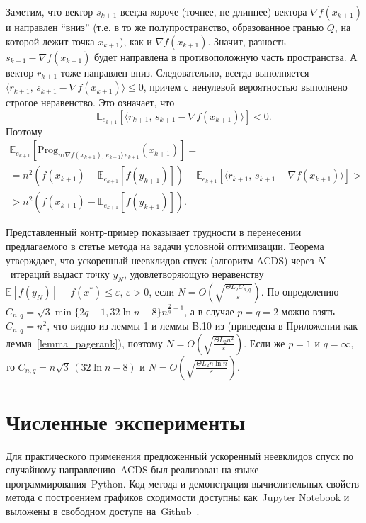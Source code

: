 \documentclass[11pt]{article}
\def\Prog{\text{Prog}}
\newcommand{\E}{\mathbb{E}}
\begin{document}
		Заметим, что вектор $s_{k+1}$ всегда короче (точнее, не длиннее) вектора $\nabla f(x_{k+1})$ и направлен ``вниз'' (т.е. в то же полупространство, образованное гранью $Q$, на которой лежит точка $x_{k+1}$), как и $\nabla f(x_{k+1})$. Значит, разность $s_{k+1} - \nabla f(x_{k+1})$ будет направлена в противоположную часть пространства. А вектор $r_{k+1}$ тоже направлен вниз. Следовательно, всегда выполняется $\langle r_{k+1}, \, s_{k+1} - \nabla f(x_{k+1})\rangle \leqslant 0$, причем с ненулевой вероятностью выполнено строгое неравенство. Это означает, что 
		$$
		\E_{e_{k+1}}\left[\langle r_{k+1}, \, s_{k+1} - \nabla f(x_{k+1})\rangle\right] < 0.
		$$
		Поэтому
		\begin{equation*}
			\begin{array}{l}
				\E_{e_{k+1}}\left[\Prog_{n\langle\nabla f(x_{k+1}), \, e_{k+1}\rangle \,  e_{k+1}}(x_{k+1})\right]=\\ = n^2(f(x_{k+1}) - \E_{e_{k+1}}[f(y_{k+1})]) - \E_{e_{k+1}}\left[\langle r_{k+1}, \, s_{k+1} - \nabla f(x_{k+1})\rangle\right]>\\ > n^2 \left ( f(x_{k+1}) - \E_{e_{k+1}} \left [f(y_{k+1}) \right ] \right ).
			\end{array}
		\end{equation*}
		
		
	Представленный контр-пример показывает трудности в перенесении предлагаемого в статье метода на задачи условной оптимизации. Теорема утверждает, что ускоренный неевклидов спуск (алгоритм ACDS) через $N$~итераций выдаст точку $y_N$, удовлетворяющую неравенству $\E[f(y_N)] - f(x^*) \leqslant \varepsilon,\, \varepsilon > 0$, если $N = O\left(\sqrt{\frac{\Theta L_2C_{n,q}}{\varepsilon}} \right)$. По определению $C_{n,q} = \sqrt{3}\min\{2q-1,32\ln n -8\}n^{\frac{2}{q}+1}$, а в случае $p= q =2$ можно взять $C_{n,q} = n^2$, что видно из леммы 1 и леммы B.10 из \cite{pagerank} (приведена в Приложении как лемма~\ref{lemma_pagerank}), поэтому $N = O\left(\sqrt{\frac{\Theta L_2n^2}{\varepsilon}} \right)$. Если же $p=1$ и $q=\infty$, то $C_{n,q} =n \sqrt{3} \, (32\ln n-8)$ и $N = O\left(\sqrt{\frac{\Theta L_2n\ln n}{\varepsilon}} \right)$.
	
	\section{Численные эксперименты}
	Для практического применения предложенный ускоренный неевклидов спуск по случайному направлению~ACDS был реализован на языке программирования~Python.
	Код метода и демонстрация
	вычислительных свойств метода
	с построением графиков сходимости доступны как~Jupyter Notebook и выложены
	в свободном доступе на~Github~\cite{git}.
	
\end{document}
